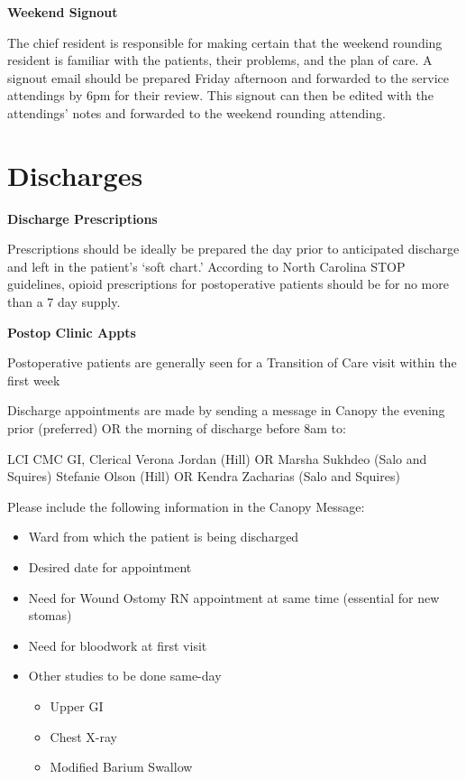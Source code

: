 \documentclass[
]{book}
\providecommand{\tightlist}{%
  \setlength{\itemsep}{0pt}\setlength{\parskip}{0pt}}
\begin{document}
\textbf{Weekend Signout}

The chief resident is responsible for making certain that the weekend rounding resident is familiar with the patients, their problems, and the plan of care. A signout email should be prepared Friday afternoon and forwarded to the service attendings by 6pm for their review. This signout can then be edited with the attendings' notes and forwarded to the weekend rounding attending.

\hypertarget{discharges}{%
\chapter{Discharges}\label{discharges}}

\textbf{Discharge Prescriptions}

Prescriptions should be ideally be prepared the day prior to anticipated discharge and left in the patient's `soft chart.' According to North Carolina STOP guidelines, opioid prescriptions for postoperative patients should be for no more than a 7 day supply.

\textbf{Postop Clinic Appts}

Postoperative patients are generally seen for a Transition of Care visit within the first week

Discharge appointments are made by sending a message in Canopy the evening prior (preferred) OR the morning of discharge before 8am to:

LCI CMC GI, Clerical
Verona Jordan (Hill) OR Marsha Sukhdeo (Salo and Squires)
Stefanie Olson (Hill) OR Kendra Zacharias (Salo and Squires)

Please include the following information in the Canopy Message:

\begin{itemize}
\tightlist
\item
  Ward from which the patient is being discharged
\item
  Desired date for appointment
\item
  Need for Wound Ostomy RN appointment at same time (essential for new stomas)
\item
  Need for bloodwork at first visit
\item
  Other studies to be done same-day

  \begin{itemize}
  \tightlist
  \item
    Upper GI
  \item
    Chest X-ray
  \item
    Modified Barium Swallow
  \end{itemize}
\end{itemize}
\end{document}
